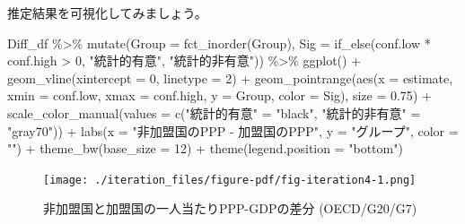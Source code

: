 \documentclass[
  a4paper,
  pandoc,
  ja=standard,
  jafont=haranoaji]{bxjsbook}
\newenvironment{Shaded}{\begin{snugshade}}{\end{snugshade}}
\newcommand{\AttributeTok}[1]{\textcolor[rgb]{0.00,0.48,0.65}{#1}}
\newcommand{\DecValTok}[1]{\textcolor[rgb]{0.68,0.00,0.00}{#1}}
\newcommand{\FloatTok}[1]{\textcolor[rgb]{0.68,0.00,0.00}{#1}}
\newcommand{\FunctionTok}[1]{\textcolor[rgb]{0.28,0.35,0.67}{#1}}
\newcommand{\NormalTok}[1]{\textcolor[rgb]{0.00,0.48,0.65}{#1}}
\newcommand{\OtherTok}[1]{\textcolor[rgb]{0.00,0.48,0.65}{#1}}
\newcommand{\SpecialCharTok}[1]{\textcolor[rgb]{0.37,0.37,0.37}{#1}}
\newcommand{\StringTok}[1]{\textcolor[rgb]{0.13,0.47,0.30}{#1}}
\begin{document}
推定結果を可視化してみましょう。

\begin{Shaded}
\begin{Highlighting}[numbers=left,,]
\NormalTok{Diff\_df }\SpecialCharTok{\%\textgreater{}\%}
  \FunctionTok{mutate}\NormalTok{(}\AttributeTok{Group =} \FunctionTok{fct\_inorder}\NormalTok{(Group),}
         \AttributeTok{Sig   =} \FunctionTok{if\_else}\NormalTok{(conf.low }\SpecialCharTok{*}\NormalTok{ conf.high }\SpecialCharTok{\textgreater{}} \DecValTok{0}\NormalTok{, }\StringTok{"統計的有意"}\NormalTok{,}
                         \StringTok{"統計的非有意"}\NormalTok{)) }\SpecialCharTok{\%\textgreater{}\%}
  \FunctionTok{ggplot}\NormalTok{() }\SpecialCharTok{+}
  \FunctionTok{geom\_vline}\NormalTok{(}\AttributeTok{xintercept =} \DecValTok{0}\NormalTok{, }\AttributeTok{linetype =} \DecValTok{2}\NormalTok{) }\SpecialCharTok{+}
  \FunctionTok{geom\_pointrange}\NormalTok{(}\FunctionTok{aes}\NormalTok{(}\AttributeTok{x =}\NormalTok{ estimate, }\AttributeTok{xmin =}\NormalTok{ conf.low, }\AttributeTok{xmax =}\NormalTok{ conf.high,}
                      \AttributeTok{y =}\NormalTok{ Group, }\AttributeTok{color =}\NormalTok{ Sig), }\AttributeTok{size =} \FloatTok{0.75}\NormalTok{) }\SpecialCharTok{+}
  \FunctionTok{scale\_color\_manual}\NormalTok{(}\AttributeTok{values =} \FunctionTok{c}\NormalTok{(}\StringTok{"統計的有意"}   \OtherTok{=} \StringTok{"black"}\NormalTok{,}
                                \StringTok{"統計的非有意"} \OtherTok{=} \StringTok{"gray70"}\NormalTok{)) }\SpecialCharTok{+}
  \FunctionTok{labs}\NormalTok{(}\AttributeTok{x =} \StringTok{"非加盟国のPPP {-} 加盟国のPPP"}\NormalTok{, }\AttributeTok{y =} \StringTok{"グループ"}\NormalTok{, }\AttributeTok{color =} \StringTok{""}\NormalTok{) }\SpecialCharTok{+}
  \FunctionTok{theme\_bw}\NormalTok{(}\AttributeTok{base\_size   =} \DecValTok{12}\NormalTok{) }\SpecialCharTok{+}
  \FunctionTok{theme}\NormalTok{(}\AttributeTok{legend.position =} \StringTok{"bottom"}\NormalTok{)}
\end{Highlighting}
\end{Shaded}

\begin{figure}[H]

{\centering \texttt{[image: ./iteration\_files/figure-pdf/fig-iteration4-1.png]}

}

\caption{\label{fig-iteration4}非加盟国と加盟国の一人当たりPPP-GDPの差分
(OECD/G20/G7)}

\end{figure}
\end{document}
